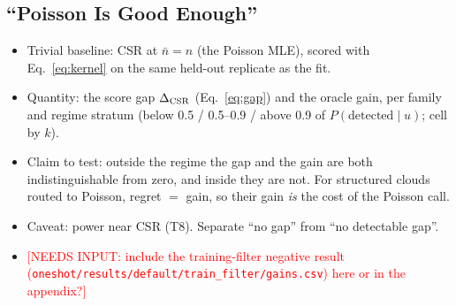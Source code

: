 \documentclass[twoside]{article}
\newcommand{\NI}[1]{\textcolor{red}{[NEEDS INPUT: #1]}}
\newcommand{\src}[1]{{\footnotesize\texttt{#1}}}
\newcommand{\nb}{\bar n}
\begin{document}
\subsection{``Poisson Is Good Enough''}
\begin{itemize}
  \item Trivial baseline: CSR at $\nb=n$ (the Poisson MLE), scored with Eq.~\ref{eq:kernel} on the same held-out
        replicate as the fit.
  \item Quantity: the score gap $\Delta_{\rm CSR}$ (Eq.~\ref{eq:gap}) and the oracle gain, per family and regime
        stratum (below 0.5 / 0.5--0.9 / above 0.9 of $P(\text{detected}\mid u)$; cell by $k$).
  \item Claim to test: outside the regime the gap and the gain are both indistinguishable from zero, and inside
        they are not. For structured clouds routed to Poisson, regret $=$ gain, so their gain \emph{is} the cost of
        the Poisson call.
  \item Caveat: power near CSR (T8). Separate ``no gap'' from ``no detectable gap''.
  \item \NI{include the training-filter negative result (\src{oneshot/results/default/train\_filter/gains.csv}) here
        or in the appendix?}
\end{itemize}

\begin{table}[t]
\caption{[PLACEHOLDER — Score gap between the fitted model and a Poisson fit, inside versus outside each family's regime.]}
\label{tab:poisson-gap}
\end{table}
\end{document}
